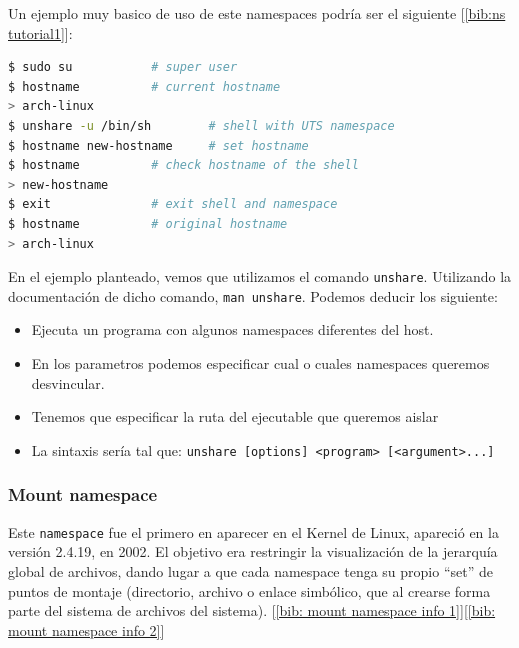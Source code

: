 \documentclass[12pt]{article}
\begin{document}
	\par \noindent Un ejemplo muy basico de uso de este namespaces podría ser el siguiente [\ref{bib:ns tutorial1}]:\\
	\begin{lstlisting}[language=bash, caption=Ejemplo de uso de UTS namespace]
$ sudo su			# super user
$ hostname			# current hostname
> arch-linux					
$ unshare -u /bin/sh		# shell with UTS namespace
$ hostname new-hostname		# set hostname
$ hostname			# check hostname of the shell
> new-hostname
$ exit				# exit shell and namespace
$ hostname			# original hostname
> arch-linux
	\end{lstlisting}

	\addvspace{10px}

	\par \noindent En el ejemplo planteado, vemos que utilizamos el comando \texttt{unshare}. Utilizando la documentación de dicho comando, \texttt{man unshare}. Podemos deducir los siguiente:
	\begin{itemize}
		\item Ejecuta un programa con algunos namespaces diferentes del host.
		\item En los parametros podemos especificar cual o cuales namespaces queremos desvincular.
		\item Tenemos que especificar la ruta del ejecutable que queremos aislar
		\item La sintaxis sería tal que: \texttt{unshare [options] <program> [<argument>...]}
	\end{itemize}
	
	\pagebreak
	
	
	\subsubsection{Mount namespace}
	\noindent Este \texttt{namespace} fue el primero en aparecer en el Kernel de Linux, apareció en la versión 2.4.19, en 2002. El objetivo era restringir la visualización de la jerarquía global de archivos, dando lugar a que cada namespace tenga su propio ``set'' de puntos de montaje (directorio, archivo o enlace simbólico, que al crearse forma parte del sistema de archivos del sistema). [\ref{bib: mount namespace info 1}][\ref{bib: mount namespace info 2}] \\
	
\end{document}
